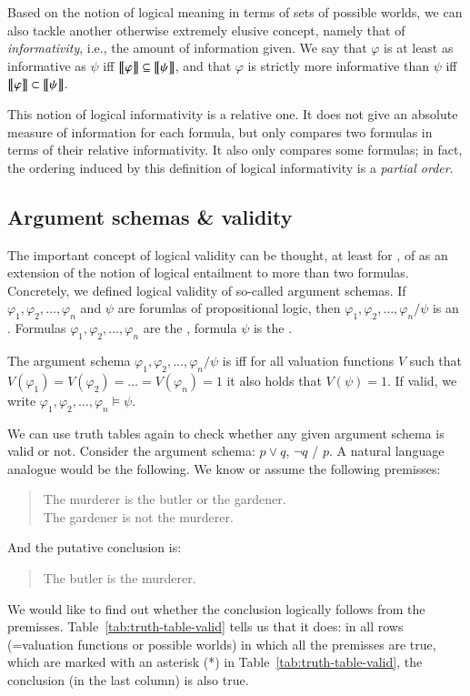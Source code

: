 \documentclass[nobib,nofonts]{tufte-handout}
\newcommand{\proplog}{\acro{PropLog}}
\begin{document}
Based on the notion of logical meaning in terms of sets of possible worlds, we can also tackle another otherwise extremely elusive concept, namely that of \emph{informativity}, i.e., the amount of information given.
We say that $\varphi$ is at least as informative as $\psi$ iff $\left [\! \left [ \varphi \right ]\! \right] \subseteq \left [\! \left [ \psi \right ]\! \right]$, and that $\varphi$ is strictly more informative than $\psi$ iff $\left [\! \left [ \varphi \right ]\! \right] \subset \left [\! \left [ \psi \right ]\! \right]$.

This notion of logical informativity is a relative one.
It does not give an absolute measure of information for each formula, but only compares two formulas in terms of their relative informativity.
It also only compares some formulas; in fact, the ordering induced by this definition of logical informativity is a \emph{partial order}.

\subsection{Argument schemas \& validity}

The important concept of logical validity can be thought, at least for \proplog, of as an extension of the notion of logical entailment to more than two formulas.
Concretely, we defined logical validity of so-called argument schemas.
If $\varphi_1, \varphi_2, \dots, \varphi_n$ and $\psi$ are forumlas of propositional logic, then $\varphi_1, \varphi_2, \dots, \varphi_n / \psi$ is an .
Formulas $\varphi_1, \varphi_2, \dots, \varphi_n$ are the , formula $\psi$ is the .

The argument schema $\varphi_1, \varphi_2, \dots, \varphi_n / \psi$ is  iff for all
valuation functions $V$ such that $V(\varphi_1)=V(\varphi_2)= \dots = V(\varphi_n)=1$ it also holds
that $V(\psi) = 1$.
If valid, we write $\varphi_1, \varphi_2, \dots, \varphi_n \models \psi$.

We can use truth tables again to check whether any given argument schema is valid or not.
Consider the argument schema: $p \vee q$, $\neg q$ / $p$.
A natural language analogue would be the following.
We know or assume the following premisses:
\begin{quote}
  The murderer is the butler or the gardener. \\
  The gardener is not the murderer.
\end{quote}
And the putative conclusion is:
\begin{quote}
  The butler is the murderer.
\end{quote}
We would like to find out whether the conclusion logically follows from the premisses.
Table~\ref{tab:truth-table-valid} tells us that it does: in all rows (=valuation functions or possible worlds) in which all the premisses are true, which are marked with an asterisk (*) in Table~\ref{tab:truth-table-valid}, the conclusion (in the last column) is also true.
\end{document}
